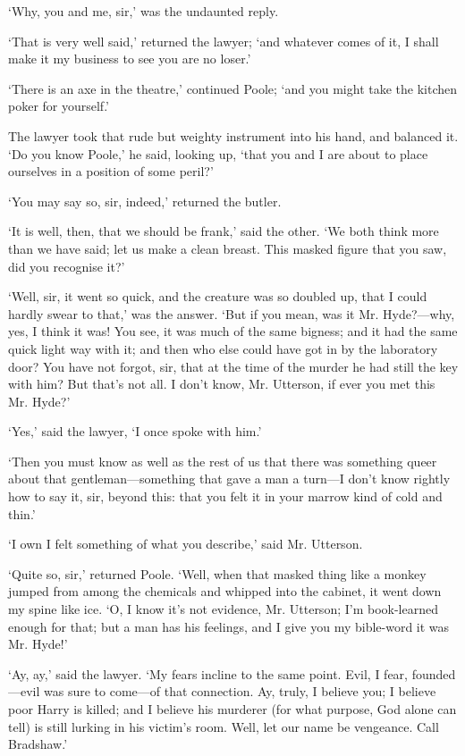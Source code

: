 \documentclass[]{novel}
\begin{document}
‘Why, you and me, sir,’ was the undaunted reply.

‘That is very well said,’ returned the lawyer; ‘and what\-ever comes of it, I shall make it my business to see you are no loser.’

‘There is an axe in the theatre,’ continued Poole; ‘and you might take the kitchen poker for yourself.’

The lawyer took that rude but weighty instrument into his hand, and balanced it. ‘Do you know Poole,’ he said, looking up, ‘that you and I are about to place ourselves in a position of some peril?’

‘You may say so, sir, indeed,’ returned the butler.

‘It is well, then, that we should be frank,’ said the other. ‘We both think more than we have said; let us make a clean breast. This masked figure that you saw, did you recognise it?’

‘Well, sir, it went so quick, and the creature was so doubled up, that I could hardly swear to that,’ was the answer. ‘But if you mean, was it Mr. Hyde?—why, yes, I think it was! You see, it was much of the same bigness; and it had the same quick light way with it; and then who else could have got in by the laboratory door? You have not forgot, sir, that at the time of the murder he had still the key with him? But that’s not all. I don’t know, Mr. Utterson, if ever you met this Mr. Hyde?’

‘Yes,’ said the lawyer, ‘I once spoke with him.’

‘Then you must know as well as the rest of us that there was something queer about that gentleman—something that gave a man a turn—I don’t know rightly how to say it, sir, beyond this: that you felt it in your marrow kind of cold and thin.’

‘I own I felt something of what you describe,’ said Mr. Utterson.

‘Quite so, sir,’ returned Poole. ‘Well, when that masked thing like a monkey jumped from among the chemicals and whipped into the cabinet, it went down my spine like ice. ‘O, I know it’s not evidence, Mr. Utterson; I’m book-learned enough for that; but a man has his feelings, and I give you my bible-word it was Mr. Hyde!’

‘Ay, ay,’ said the lawyer. ‘My fears incline to the same point. Evil, I fear, founded—evil was sure to come—of that connection. Ay, truly, I believe you; I believe poor Harry is killed; and I believe his murderer (for what purpose, God alone can tell) is still lurking in his victim’s room. Well, let our name be vengeance. Call Bradshaw.’
\end{document}
